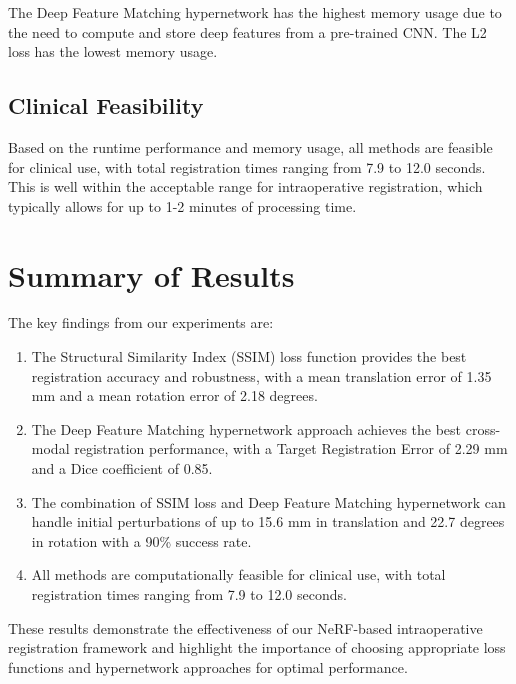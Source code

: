 The Deep Feature Matching hypernetwork has the highest memory usage due to the need to compute and store deep features from a pre-trained CNN. The L2 loss has the lowest memory usage.

\subsection{Clinical Feasibility}
Based on the runtime performance and memory usage, all methods are feasible for clinical use, with total registration times ranging from 7.9 to 12.0 seconds. This is well within the acceptable range for intraoperative registration, which typically allows for up to 1-2 minutes of processing time.

\section{Summary of Results}
The key findings from our experiments are:

\begin{enumerate}
    \item The Structural Similarity Index (SSIM) loss function provides the best registration accuracy and robustness, with a mean translation error of 1.35 mm and a mean rotation error of 2.18 degrees.
    
    \item The Deep Feature Matching hypernetwork approach achieves the best cross-modal registration performance, with a Target Registration Error of 2.29 mm and a Dice coefficient of 0.85.
    
    \item The combination of SSIM loss and Deep Feature Matching hypernetwork can handle initial perturbations of up to 15.6 mm in translation and 22.7 degrees in rotation with a 90\% success rate.
    
    \item All methods are computationally feasible for clinical use, with total registration times ranging from 7.9 to 12.0 seconds.
\end{enumerate}

These results demonstrate the effectiveness of our NeRF-based intraoperative registration framework and highlight the importance of choosing appropriate loss functions and hypernetwork approaches for optimal performance. 